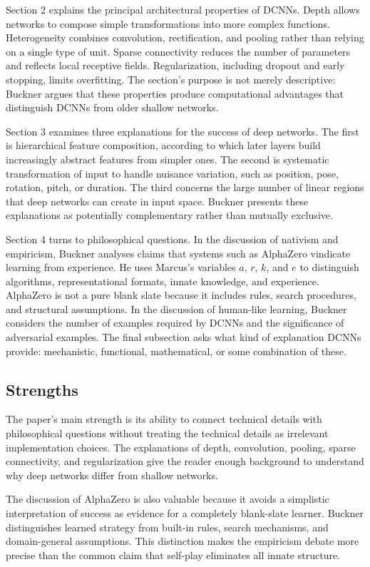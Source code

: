 \documentclass[11pt]{article}
\begin{document}
Section 2 explains the principal architectural properties of DCNNs. Depth allows networks to compose simple transformations into more complex functions. Heterogeneity combines convolution, rectification, and pooling rather than relying on a single type of unit. Sparse connectivity reduces the number of parameters and reflects local receptive fields. Regularization, including dropout and early stopping, limits overfitting. The section's purpose is not merely descriptive: Buckner argues that these properties produce computational advantages that distinguish DCNNs from older shallow networks.

Section 3 examines three explanations for the success of deep networks. The first is hierarchical feature composition, according to which later layers build increasingly abstract features from simpler ones. The second is systematic transformation of input to handle nuisance variation, such as position, pose, rotation, pitch, or duration. The third concerns the large number of linear regions that deep networks can create in input space. Buckner presents these explanations as potentially complementary rather than mutually exclusive.

Section 4 turns to philosophical questions. In the discussion of nativism and empiricism, Buckner analyses claims that systems such as AlphaZero vindicate learning from experience. He uses Marcus's variables $a$, $r$, $k$, and $e$ to distinguish algorithms, representational formats, innate knowledge, and experience. AlphaZero is not a pure blank slate because it includes rules, search procedures, and structural assumptions. In the discussion of human-like learning, Buckner considers the number of examples required by DCNNs and the significance of adversarial examples. The final subsection asks what kind of explanation DCNNs provide: mechanistic, functional, mathematical, or some combination of these.

\subsection{Strengths}

The paper's main strength is its ability to connect technical details with philosophical questions without treating the technical details as irrelevant implementation choices. The explanations of depth, convolution, pooling, sparse connectivity, and regularization give the reader enough background to understand why deep networks differ from shallow networks.

The discussion of AlphaZero is also valuable because it avoids a simplistic interpretation of success as evidence for a completely blank-slate learner. Buckner distinguishes learned strategy from built-in rules, search mechanisms, and domain-general assumptions. This distinction makes the empiricism debate more precise than the common claim that self-play eliminates all innate structure.
\end{document}

